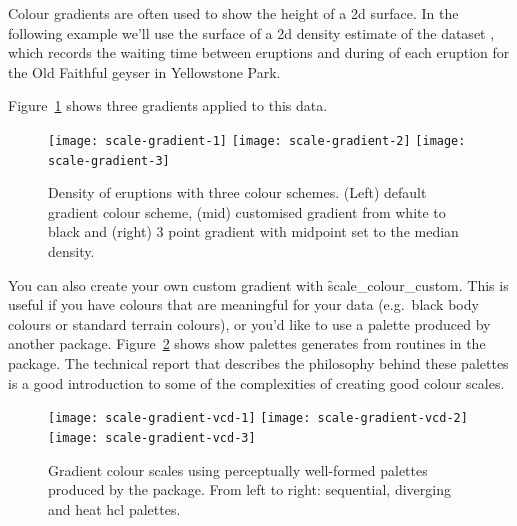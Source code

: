 Colour gradients are often used to show the height of a 2d surface.  In the following example we'll use the surface of a 2d density estimate of the  dataset \citep{azzalini:1990}, which records the waiting time between eruptions and during of each eruption for the Old Faithful geyser in Yellowstone Park.  

Figure~\ref{fig:gradient} shows three gradients applied to this data.


\begin{figure}[htbp]
  \centering
    \texttt{[image: scale-gradient-1]}%
    \texttt{[image: scale-gradient-2]}%
    \texttt{[image: scale-gradient-3]}
  \caption{Density of eruptions with three colour schemes.  (Left) default gradient colour scheme, (mid) customised gradient from white to black and (right) 3 point gradient with midpoint set to the median density.}
  \label{fig:gradient}
\end{figure}


You can also create your own custom gradient with \f{scale_colour_custom}.  This is useful if you have colours that are meaningful for your data (e.g.\ black body colours or standard terrain colours), or you'd like to use a palette produced by another package.  Figure~\ref{fig:vcd} shows show palettes generates from routines in the  package.  The technical report \citet{zeileis:2007} that describes the philosophy behind these palettes is a good introduction to some of the complexities of creating good colour scales.


\begin{figure}[htbp]
  \centering
    \texttt{[image: scale-gradient-vcd-1]}%
    \texttt{[image: scale-gradient-vcd-2]}%
    \texttt{[image: scale-gradient-vcd-3]}
  \caption{Gradient colour scales using perceptually well-formed palettes produced by the  package.  From left to right: sequential, diverging and heat hcl palettes.}
  \label{fig:vcd}
\end{figure}

